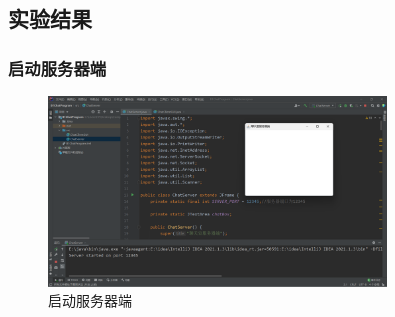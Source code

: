 \documentclass[UTF8,12pt]{article}
\begin{document}
\subsection{实验结果}
\subsubsection{启动服务器端}
\begin{figure}[htbp]
    \centering
    \includegraphics[width=0.8\textwidth]{img/2.png}
    \caption{启动服务器端}
\end{figure}
\end{document}
